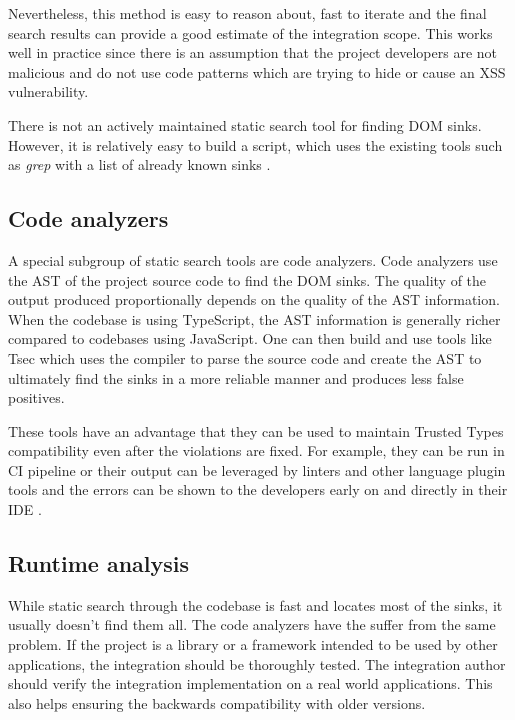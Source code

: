 Nevertheless, this method is easy to reason about, fast to iterate and the final search results can
provide a good estimate of the integration scope. This works well in practice since there is an
assumption that the project developers are not malicious and do not use code patterns which are
trying to hide or cause an XSS vulnerability.

There is not an actively maintained static search tool for finding DOM sinks. However, it is
relatively easy to build a script, which uses the existing tools such as \emph{grep} with a list
of already known sinks \cite{xss_sink_finder}.

\subsection{Code analyzers}

A special subgroup of static search tools are code analyzers. Code analyzers use the AST of the
project source code to find the DOM sinks. The quality of the output produced proportionally depends
on the quality of the AST information. When the codebase is using TypeScript, the AST information is
generally richer compared to codebases using JavaScript. One can then build and use tools like Tsec
\cite{tsec_github} which uses the compiler to parse the source code and create the AST to ultimately
find the sinks in a more reliable manner and produces less false positives.

These tools have an advantage that they can be used to maintain Trusted Types compatibility even
after the violations are fixed. For example, they can be run in CI pipeline or their output can be
leveraged by linters and other language plugin tools and the errors can be shown to the developers
early on and directly in their IDE \cite{tsec_lsp}.

\subsection{Runtime analysis}

While static search through the codebase is fast and locates most of the sinks, it usually doesn't
find them all. The code analyzers have the suffer from the same problem. If the project is a library
or a framework intended to be used by other applications, the integration should be thoroughly
tested. The integration author should verify the integration implementation on a real world
applications. This also helps ensuring the backwards compatibility with older versions.

